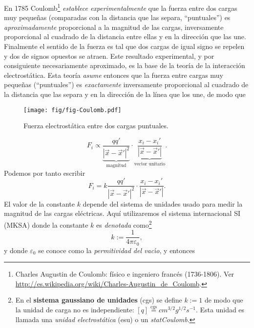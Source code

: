 En 1785 Coulomb\footnote{Charles Augustin de Coulomb: físico e ingeniero francés (1736-1806). Ver \url{http://es.wikipedia.org/wiki/Charles-Augustin_de_Coulomb}.} \textit{establece experimentalmente} que la fuerza entre dos cargas muy pequeñas (comparadas con la distancia que las separa, ``puntuales'') es \textit{aproximadamente}  proporcional a la magnitud de las cargas, inversamente proporcional al cuadrado de la distancia entre ellas y en la dirección que las
une. Finalmente el sentido de la fuerza es tal que dos cargas de igual signo se repelen y dos de signos opuestos se atraen. Este resultado experimental, y por consiguiente necesariamente aproximado, es la base de la teoría de la interacción electrostática. Esta teoría \textit{asume} entonces que la fuerza entre cargas muy pequeñas (``puntuales'') es \textit{exactamente} inversamente proporcional al cuadrado de la distancia que las separa y en la dirección de la línea que los une, de modo que
\begin{center}
\begin{figure}[H]
\centerline{\texttt{[image: fig/fig-Coulomb.pdf]}}
\caption{Fuerza electrostática entre dos cargas puntuales.}
\label{fig:Coulomb}
\end{figure}
\end{center}
\begin{equation}
F_i\propto \underbrace{\frac{qq'}{\left\vert \vec{x}-\vec{x}'\right\vert^2}}_\text{magnitud}\cdot \underbrace{\frac{x_i-x_i'}{\left\vert \vec{x}-\vec{x}'\right\vert }}_\text{vector unitario}.
\end{equation}
Podemos por tanto escribir
\begin{equation}
F_i=k\frac{qq'}{\left\vert \vec x-\vec x'\right\vert^2}
\cdot\frac{x_i-x_i'}{\left\vert \vec x-\vec x'\right\vert }.
\end{equation}
El valor de la constante $k$ depende del sistema de unidades usado para medir la magnitud de las cargas eléctricas. Aquí utilizaremos el sistema internacional SI (MKSA) donde la constante $k$ es \textit{denotada} como\footnote{En el \textbf{sistema gaussiano de unidades} (cgs) se define $k:=1$ de modo que la unidad de carga no es independiente: $[q]\stackrel{\text{cgs}}{=}cm^{3/2}g^{1/2}s^{-1}$. Esta unidad es llamada una \textit{unidad electrostática} (esu) o un \textit{statCoulomb}.}%
\begin{equation}
k:=\frac{1}{4\pi\varepsilon_0},
\end{equation}
y donde $\varepsilon_0$ se conoce como la \textit{permitividad del vac\'{\i}o}, y entonces
